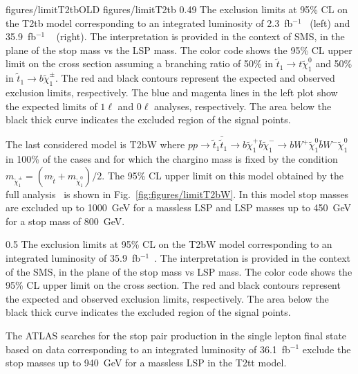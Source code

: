                  {figures/limitT2tbOLD} %
                 {figures/limitT2tb} %
                 {0.49}       %
                 { The exclusion limits at 95\% CL on the T2tb model corresponding to an integrated luminosity of 2.3~fb$^{-1}$~\cite{Sirunyan:2016jpr} (left) and   35.9~fb$^{-1}$ ~\cite{Sirunyan:2017xse} (right). The interpretation is provided in the context of SMS, in the plane of the stop mass vs the LSP mass. The color code shows the 95\% CL upper limit on the cross section assuming a branching ratio of 50\% in $ \tilde{t}_{1} \to t  \tilde{\chi}^{0}_{1} $ and 50\% in $ \tilde{t}_{1} \to b  \tilde{\chi}^{\pm}_{1} $. The red and black contours represent the expected and observed exclusion limits, respectively. The blue and magenta lines in the left plot show the expected limits of $1 \ell$ and $0 \ell$ analyses, respectively.  The area below the black thick curve indicates the excluded region of the signal points.  }

The last considered model is T2bW where $ pp \to \tilde{t}_{1} \bar{\tilde{t}}_{1} \to b \tilde{\chi}^{+}_{1} \bar{b} \tilde{\chi}^{-}_{1} \to b W^{+} \tilde{\chi}^{0}_{1} \bar{b} W^{-} \tilde{\chi}^{0}_{1}$ in 100\% of the cases and  for which the chargino mass is fixed by the condition $m_{\tilde{\chi}_{1}^{\pm}} = ( m_{\tilde{t}} +  m_{\tilde{\chi}_{1}^{0}} )/2$. The 95\% CL upper limit on this model obtained by the full analysis~\cite{Sirunyan:2017xse} is shown in Fig.~\ref{fig:figures/limitT2bW}. In this model stop masses are excluded up to 1000~GeV for a massless LSP and LSP masses up to 450~GeV for a stop mass of 800~GeV.

                 {0.5}       %
                 { The exclusion limits at 95\% CL on the T2bW model corresponding to an integrated luminosity of 35.9~fb$^{-1}$~\cite{Sirunyan:2017xse}. The interpretation is provided in the context of the SMS, in the plane of the stop mass vs LSP mass. The color code shows the 95\% CL upper limit on the cross section. The red and black contours represent the expected and observed exclusion limits, respectively. The area below the black thick curve indicates the excluded region of the signal points.  }

The ATLAS searches for the stop pair production in the single lepton final state~\cite{Aaboud:2017aeu} based on data corresponding to an integrated luminosity of 36.1~fb$^{-1}$ exclude the stop masses up to 940~GeV for a massless LSP in the T2tt model. 

